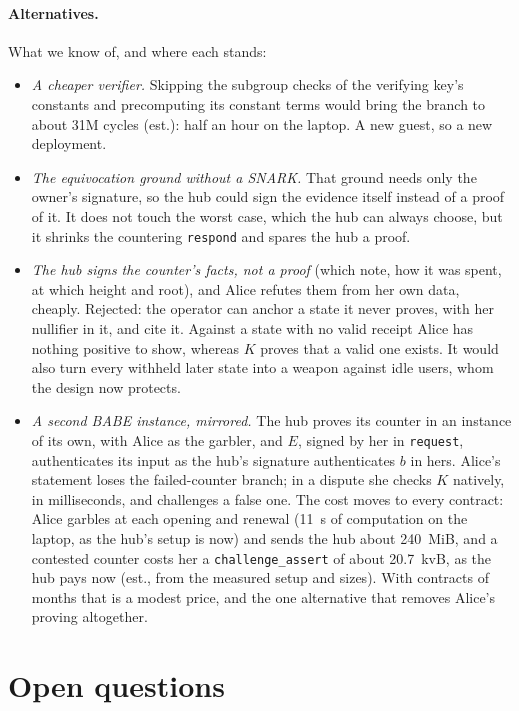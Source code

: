 \documentclass[11pt]{article}
\newcommand{\tx}[1]{\texttt{#1}}
\begin{document}
\paragraph{Alternatives.} What we know of, and where each stands:
\begin{itemize}[leftmargin=1.5em]
\item \emph{A cheaper verifier.} Skipping the subgroup checks of the
  verifying key's constants and precomputing its constant terms would
  bring the branch to about 31M cycles (est.): half an hour on the
  laptop. A new guest, so a new deployment.
\item \emph{The equivocation ground without a SNARK.} That ground needs
  only the owner's signature, so the hub could sign the evidence itself
  instead of a proof of it. It does not touch the worst case, which the
  hub can always choose, but it shrinks the countering \tx{respond} and
  spares the hub a proof.
\item \emph{The hub signs the counter's facts, not a proof} (which note,
  how it was spent, at which height and root), and Alice refutes them
  from her own data, cheaply. Rejected: the operator can anchor a state
  it never proves, with her nullifier in it, and cite it. Against a state
  with no valid receipt Alice has nothing positive to show, whereas $K$
  proves that a valid one exists. It would also turn every withheld
  later state into a weapon against idle users, whom the design now
  protects.
\item \emph{A second BABE instance, mirrored.} The hub proves its counter
  in an instance of its own, with Alice as the garbler, and $E$, signed
  by her in \tx{request}, authenticates its input as the hub's signature
  authenticates $b$ in hers. Alice's statement loses the failed-counter
  branch; in a dispute she checks $K$ natively, in milliseconds, and
  challenges a false one. The cost moves to every contract: Alice
  garbles at each opening and renewal (11~s of computation on the
  laptop, as the hub's setup is now) and sends the hub about 240~MiB,
  and a contested counter costs her a \tx{challenge\_assert} of about
  20.7~kvB, as the hub pays now (est., from the measured setup and
  sizes). With contracts of months that is a modest price, and the one
  alternative that removes Alice's proving altogether.
\end{itemize}

\section{Open questions}
\label{sec:open}
\end{document}
